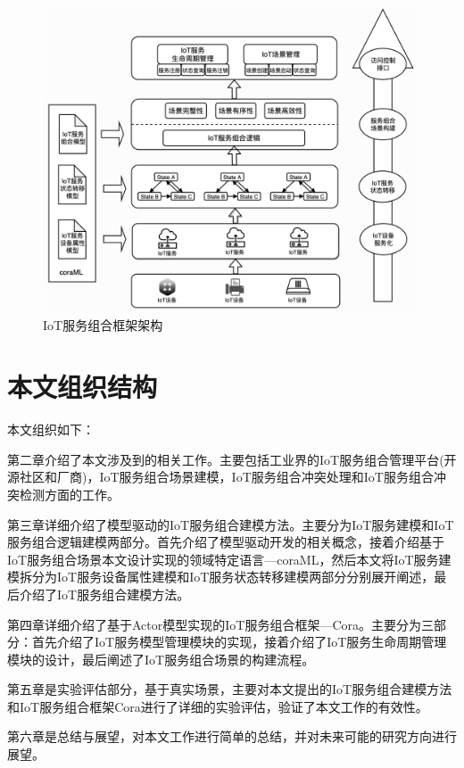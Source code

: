 \documentclass[winfonts,master,twoside]{njuthesis}
\begin{document}
\begin{figure}
	\centering
	\includegraphics[width=\textwidth]{figure/cora.png}
	\caption{IoT服务组合框架架构}
	\label{overview}
\end{figure}

\section{本文组织结构}

本文组织如下：

第二章介绍了本文涉及到的相关工作。主要包括工业界的IoT服务组合管理平台(开源社区和厂商)，IoT服务组合场景建模，IoT服务组合冲突处理和IoT服务组合冲突检测方面的工作。

第三章详细介绍了模型驱动的IoT服务组合建模方法。主要分为IoT服务建模和IoT服务组合逻辑建模两部分。首先介绍了模型驱动开发的相关概念，接着介绍基于IoT服务组合场景本文设计实现的领域特定语言—coraML，然后本文将IoT服务建模拆分为IoT服务设备属性建模和IoT服务状态转移建模两部分分别展开阐述，最后介绍了IoT服务组合建模方法。

第四章详细介绍了基于Actor模型实现的IoT服务组合框架—Cora。主要分为三部分：首先介绍了IoT服务模型管理模块的实现，接着介绍了IoT服务生命周期管理模块的设计，最后阐述了IoT服务组合场景的构建流程。

第五章是实验评估部分，基于真实场景，主要对本文提出的IoT服务组合建模方法和IoT服务组合框架Cora进行了详细的实验评估，验证了本文工作的有效性。

第六章是总结与展望，对本文工作进行简单的总结，并对未来可能的研究方向进行展望。
\end{document}
